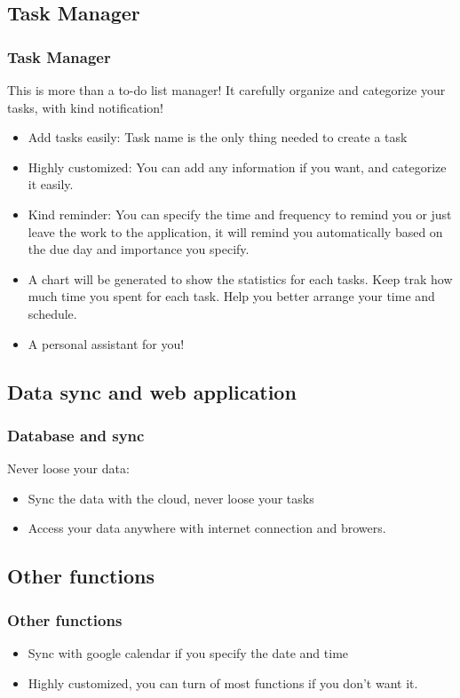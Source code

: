 \documentclass{beamer}
\begin{document}
\subsection{Task Manager}
\begin{frame}\frametitle{Task Manager}
This is more than a to-do list manager! It carefully organize and categorize
your tasks, with kind notification!
\begin{itemize}
\item Add tasks easily: Task name is the only thing needed to create a task
\pause
\item Highly customized: You can add any information if you want, and
categorize it easily.
\pause
\item Kind reminder: You can specify the time and frequency to remind you or
just leave the work to the application, it will remind you
automatically based on the due day and importance you specify.
\pause
\item A chart will be generated to show the statistics for each tasks. Keep
trak how much time you spent for each task. Help you better arrange your time
and schedule. 
\pause
\item A personal assistant for you!
\end{itemize}
\end{frame}

\subsection{Data sync and web application}
\begin{frame}\frametitle{Database and sync}
Never loose your data:
\begin{itemize}
\item Sync the data with the cloud, never loose your tasks
\pause
\item Access your data anywhere with internet connection and browers.
\end{itemize}
\end{frame}


\subsection{Other functions}
\begin{frame}\frametitle{Other functions}
\begin{itemize}
\item Sync with google calendar if you specify the date and time
\pause
\item Highly customized, you can turn of most functions if you don't want it.
\end{itemize}
\end{frame}
\end{document}
